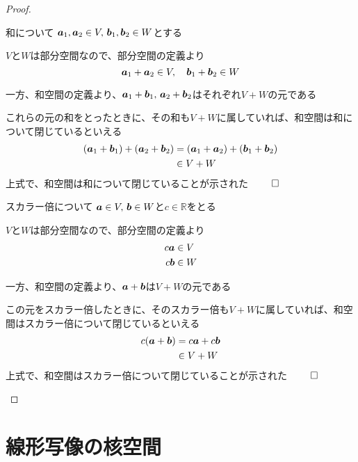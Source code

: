 \documentclass[../../../topic_linear-algebra]{subfiles}
\begin{document}
\begin{proof}
  \begin{subpattern}{和について}
    $\vb*{a}_1, \vb*{a}_2 \in V, \, \vb*{b}_1, \vb*{b}_2 \in W$とする

    $V$と$W$は部分空間なので、部分空間の定義より
    \begin{equation*}
      \vb*{a}_1 + \vb*{a}_2 \in V, \quad \vb*{b}_1 + \vb*{b}_2 \in W
    \end{equation*}

    一方、和空間の定義より、$\vb*{a}_1 + \vb*{b}_1,\, \vb*{a}_2 + \vb*{b}_2$はそれぞれ$V+W$の元である

    これらの元の和をとったときに、その和も$V + W$に属していれば、和空間は和について閉じているといえる
    \begin{align*}
      (\vb*{a}_1 + \vb*{b}_1) + (\vb*{a}_2 + \vb*{b}_2) & = (\vb*{a}_1 + \vb*{a}_2) + (\vb*{b}_1 + \vb*{b}_2) \\
                                                        & \in V + W
    \end{align*}
    上式で、和空間は和について閉じていることが示された $\qed$
  \end{subpattern}

  \begin{subpattern}{スカラー倍について}
    $\vb*{a} \in V, \, \vb*{b} \in W$と$c \in \mathbb{R}$をとる

    $V$と$W$は部分空間なので、部分空間の定義より
    \begin{align*}
      c \vb*{a} & \in V \\
      c \vb*{b} & \in W
    \end{align*}

    一方、和空間の定義より、$\vb*{a} + \vb*{b}$は$V + W$の元である

    この元をスカラー倍したときに、そのスカラー倍も$V + W$に属していれば、和空間はスカラー倍について閉じているといえる
    \begin{align*}
      c(\vb*{a} + \vb*{b}) & = c \vb*{a} + c \vb*{b} \\
                           & \in V + W
    \end{align*}
    上式で、和空間はスカラー倍について閉じていることが示された $\qed$
  \end{subpattern}
\end{proof}

\sectionline
\section{線形写像の核空間}
\end{document}
